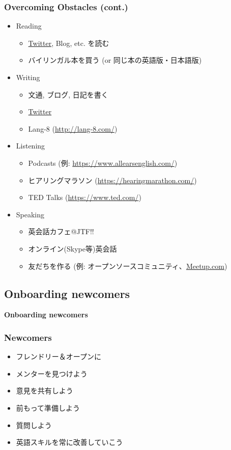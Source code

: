 \documentclass[aspectratio=169,11pt,hyperref={colorlinks=true}]{beamer}
\begin{document}
\begin{frame}
\frametitle{Overcoming Obstacles (cont.)}
  \begin{itemize}
  \item[] Reading
    \begin{itemize}
    \item \href{https://twitter.com}{Twitter}, Blog, etc. を読む
    \item バイリンガル本を買う (or 同じ本の英語版・日本語版)
    \end{itemize}
  \item[] Writing
    \begin{itemize}
    \item 文通, ブログ, 日記を書く
    \item \href{https://twitter.com}{Twitter}
    \item Lang-8 (\url{http://lang-8.com/})
    \end{itemize}
  \item[] Listening
    \begin{itemize}
    \item Podcasts (例: \url{https://www.allearsenglish.com/})
    \item ヒアリングマラソン (\url{https://hearingmarathon.com/})
    \item TED Talks (\url{https://www.ted.com/})
    \end{itemize}
  \item[] Speaking
    \begin{itemize}
    \item 英会話カフェ@JTF!!
    \item オンライン(Skype等)英会話
    \item 友だちを作る (例: オープンソースコミュニティ、\href{https://www.meetup.com/meetup-group-en-jp/}{Meetup.com})
    \end{itemize}
  \end{itemize}
\end{frame}


\subsection{Onboarding newcomers}
\begin{frame}
  \bf\Huge{Onboarding newcomers}
\end{frame}

\begin{frame}
\frametitle{Newcomers}
  \begin{itemize}
  \item フレンドリー＆オープンに
  \item メンターを見つけよう
  \item 意見を共有しよう
  \item 前もって準備しよう
  \item 質問しよう
  \item 英語スキルを常に改善していこう
  \end{itemize}
\end{frame}
\end{document}
